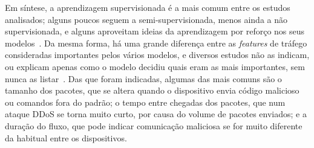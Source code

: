 \documentclass[conference,a4paper]{IEEEtran}
\begin{document}
Em síntese, a aprendizagem supervisionada é a mais comum entre os estudos analisados;
alguns poucos seguem a semi-supervisionada, menos ainda a não supervisionada, e alguns
aproveitam ideias da aprendizagem por reforço nos seus
modelos~\cite{Arulkumar2026,zolotukhin2021curious,gowtham2026fedmp,premakumari2025qlearning,kumar2025advanced}. Da mesma forma, há uma grande
diferença entre as \textit{features} de tráfego consideradas importantes pelos vários
modelos, e diversos estudos não as indicam, ou explicam apenas como o modelo decidiu
quais eram as mais importantes, sem nunca as
listar~\cite{Rasheed2026,Chaudhary2025}. Das que foram indicadas, algumas das
mais comuns são o tamanho dos pacotes, que se altera quando o dispositivo envia código
malicioso ou comandos fora do padrão; o tempo entre chegadas dos pacotes, que num ataque
DDoS se torna muito curto, por causa do volume de pacotes enviados; e a duração do fluxo,
que pode indicar comunicação maliciosa se for muito diferente da habitual entre os
dispositivos.
\end{document}
